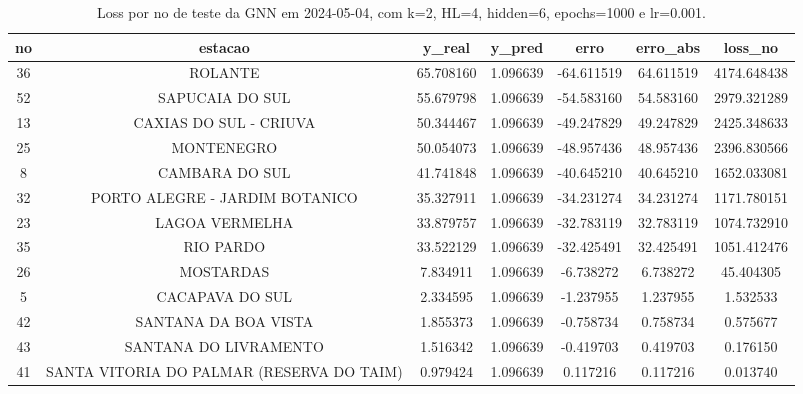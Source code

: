 \begin{table}[h]
\centering
\caption{Loss por no de teste da GNN em 2024-05-04, com k=2, HL=4, hidden=6, epochs=1000 e lr=0.001.}
\label{tab:gnn_loss_k2_hl4_h6_e1000_d20240504}
\begin{tabular}{ccccccc}
\toprule
no & estacao & y\_real & y\_pred & erro & erro\_abs & loss\_no \\
\midrule
36 & ROLANTE & 65.708160 & 1.096639 & -64.611519 & 64.611519 & 4174.648438 \\
52 & SAPUCAIA DO SUL & 55.679798 & 1.096639 & -54.583160 & 54.583160 & 2979.321289 \\
13 & CAXIAS DO SUL - CRIUVA & 50.344467 & 1.096639 & -49.247829 & 49.247829 & 2425.348633 \\
25 & MONTENEGRO & 50.054073 & 1.096639 & -48.957436 & 48.957436 & 2396.830566 \\
8 & CAMBARA DO SUL & 41.741848 & 1.096639 & -40.645210 & 40.645210 & 1652.033081 \\
32 & PORTO ALEGRE - JARDIM BOTANICO & 35.327911 & 1.096639 & -34.231274 & 34.231274 & 1171.780151 \\
23 & LAGOA VERMELHA & 33.879757 & 1.096639 & -32.783119 & 32.783119 & 1074.732910 \\
35 & RIO PARDO & 33.522129 & 1.096639 & -32.425491 & 32.425491 & 1051.412476 \\
26 & MOSTARDAS & 7.834911 & 1.096639 & -6.738272 & 6.738272 & 45.404305 \\
5 & CACAPAVA DO SUL & 2.334595 & 1.096639 & -1.237955 & 1.237955 & 1.532533 \\
42 & SANTANA DA BOA VISTA & 1.855373 & 1.096639 & -0.758734 & 0.758734 & 0.575677 \\
43 & SANTANA DO LIVRAMENTO & 1.516342 & 1.096639 & -0.419703 & 0.419703 & 0.176150 \\
41 & SANTA VITORIA DO PALMAR (RESERVA DO TAIM) & 0.979424 & 1.096639 & 0.117216 & 0.117216 & 0.013740 \\
\bottomrule
\end{tabular}
\end{table}
